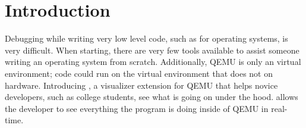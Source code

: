 


\section{Introduction}



Debugging while writing very low level code, such as for operating systems, is very difficult.
%
When starting, there are very few tools available to assist someone writing an operating system from scratch.
%
Additionally, QEMU is only an virtual environment; code could run on the virtual environment that does not on hardware.
%
Introducing \tool{}, a visualizer extension for QEMU that helps novice developers, such as college students, see what is going on under the hood.
%
\tool{} allows the developer to see everything the program is doing inside of QEMU in real-time.
%
